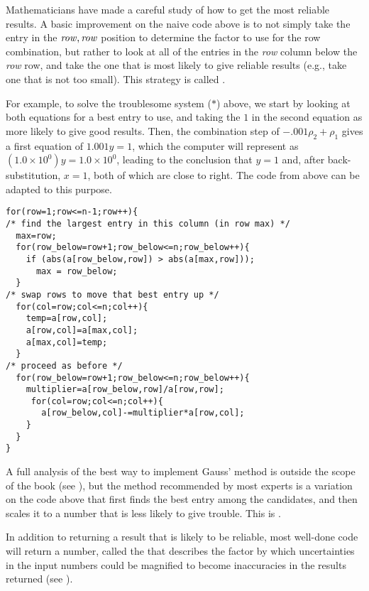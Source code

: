 Mathematicians have made a careful study of how to get the most
reliable results. 
A basic improvement on the naive code above 
is to not simply take the entry
in the $\text{\textit{row}},\text{\textit{row}}$
position to determine the factor to use for the row combination,
but rather to look at all of the entries in the \textit{row}
column below the \textit{row} row, 
and take the one that is most likely to give reliable results
(e.g., take one that is not too small).
This strategy is called .%

For example, to solve the troublesome system ($*$) above,
we start by looking at both equations for a best entry to use, 
and taking the $1$ in
the second equation as more likely to give good results.
Then, the combination step of $-.001\rho_2+\rho_1$ gives a first equation of 
$1.001y=1$, which the computer will represent as 
$(1.0\times 10^{0})y=1.0\times 10^{0}$, leading to the conclusion that 
$y=1$ and, after back-substitution, $x=1$, 
both of which are close to right.  
The code from above can be adapted to this purpose.
\begin{indented}
\small
\begin{verbatim}
for(row=1;row<=n-1;row++){
/* find the largest entry in this column (in row max) */
  max=row;
  for(row_below=row+1;row_below<=n;row_below++){
    if (abs(a[row_below,row]) > abs(a[max,row]));
      max = row_below;
  }
/* swap rows to move that best entry up */
  for(col=row;col<=n;col++){
    temp=a[row,col];
    a[row,col]=a[max,col];
    a[max,col]=temp;
  }
/* proceed as before */
  for(row_below=row+1;row_below<=n;row_below++){
    multiplier=a[row_below,row]/a[row,row];
     for(col=row;col<=n;col++){
       a[row_below,col]-=multiplier*a[row,col];
    }
  }
}
\end{verbatim}
\end{indented}

A full analysis of the best way to implement Gauss' method 
is outside the scope of the book (see \cite{Wilkinson65}),
but the method recommended by most experts 
is a variation on the code above that first finds the best entry
among the candidates, and then scales it to a number that is less
likely to give trouble.
This is 
.

In addition to returning a result that is likely to be reliable,
most well-done code will return a number, called the 
%
that describes the factor by which uncertainties in the input numbers
could be magnified to become inaccuracies in the results returned 
(see \cite{Rice}).

